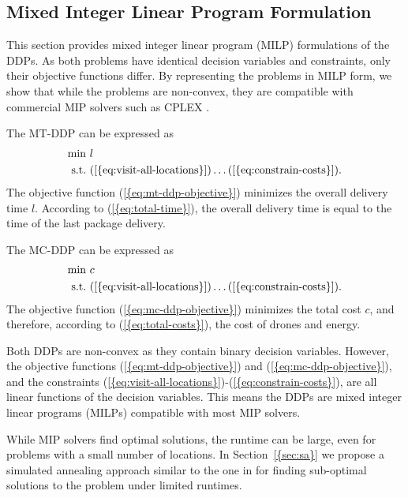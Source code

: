 \documentclass[journal]{IEEEtran}
\begin{document}
\subsection{Mixed Integer Linear Program Formulation}
\label{ssec:mixed-integer-program-formulation-ddp}

This section provides mixed integer linear program (MILP) formulations of the DDPs. As both problems have identical decision variables and constraints, only their objective functions differ. By representing the problems in MILP form, we show that while the problems are non-convex, they are compatible with commercial MIP solvers such as CPLEX \cite{cplex}.

The MT-DDP can be expressed as
\begin{align}
\min \ & {\ensuremath{l}} \label{eq:mt-ddp-objective} \\
\text{s.t.} \ & {(\ref{{eq:visit-all-locations}})} \ldots {(\ref{{eq:constrain-costs}})}. \nonumber
\end{align}
The objective function {(\ref{{eq:mt-ddp-objective}})} minimizes the overall delivery time ${\ensuremath{l}}$. According to {(\ref{{eq:total-time}})}, the overall delivery time is equal to the time of the last package delivery.

The MC-DDP can be expressed as
\begin{align}
\min \ & {\ensuremath{c}} \label{eq:mc-ddp-objective} \\
\text{s.t.} \ & {(\ref{{eq:visit-all-locations}})} \ldots {(\ref{{eq:constrain-costs}})}. \nonumber
\end{align}
The objective function {(\ref{{eq:mc-ddp-objective}})} minimizes the total cost ${\ensuremath{c}}$, and therefore, according to {(\ref{{eq:total-costs}})}, the cost of drones and energy.

Both DDPs are non-convex as they contain binary decision variables. However, the objective functions {(\ref{{eq:mt-ddp-objective}})} and {(\ref{{eq:mc-ddp-objective}})}, and the constraints {(\ref{{eq:visit-all-locations}})}-{(\ref{{eq:constrain-costs}})}, are all linear functions of the decision variables. This means the DDPs are mixed integer linear programs (MILPs) compatible with most MIP solvers.

While MIP solvers find optimal solutions, the runtime can be large, even for problems with a small number of locations. In {Section~\ref{{sec:sa}}} we propose a simulated annealing approach similar to the one in \cite{Xiao2012} for finding sub-optimal solutions to the problem under limited runtimes.
\end{document}
